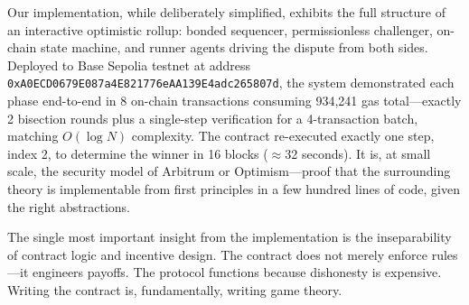\documentclass[11pt,letterpaper]{article}
\begin{document}
Our implementation, while deliberately simplified, exhibits the full structure of an interactive optimistic rollup: bonded sequencer, permissionless challenger, on-chain state machine, and runner agents driving the dispute from both sides. Deployed to Base Sepolia testnet at address \texttt{0xA0ECD0679E087a4E821776eAA139E4adc265807d}, the system demonstrated each phase end-to-end in 8 on-chain transactions consuming 934,241 gas total---exactly 2 bisection rounds plus a single-step verification for a 4-transaction batch, matching $O(\log N)$ complexity. The contract re-executed exactly one step, index 2, to determine the winner in 16 blocks ($\approx$32 seconds). It is, at small scale, the security model of Arbitrum or Optimism---proof that the surrounding theory is implementable from first principles in a few hundred lines of code, given the right abstractions.

The single most important insight from the implementation is the inseparability of contract logic and incentive design. The contract does not merely enforce rules---it engineers payoffs. The protocol functions because dishonesty is expensive. Writing the contract is, fundamentally, writing game theory.
\end{document}

